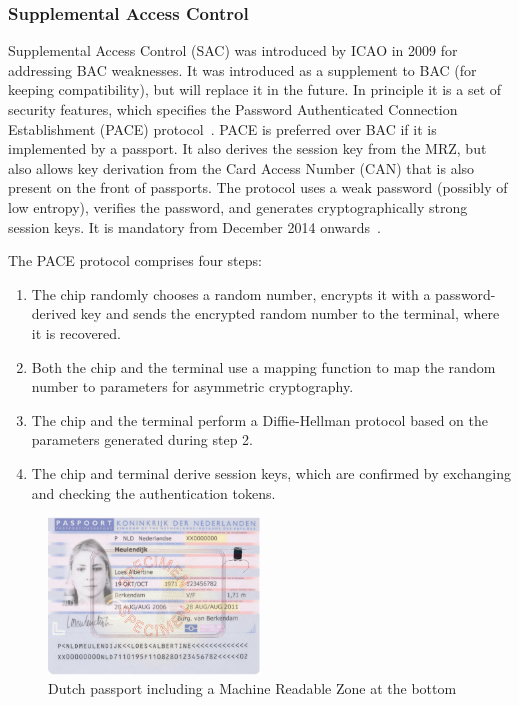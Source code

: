 \subsubsection{Supplemental Access Control}
Supplemental Access Control (SAC) was introduced by ICAO in 2009 for addressing BAC weaknesses. It was introduced as a supplement to BAC (for keeping compatibility), but will replace it in the future. In principle it is a set of security features, which specifies the Password Authenticated Connection Establishment (PACE) protocol~\cite{icao}. PACE is preferred over BAC if it is implemented by a passport. It also derives the session key from the MRZ, but also allows key derivation from the Card Access Number (CAN) that is also present on the front of passports. The protocol uses a weak password (possibly of low entropy), verifies the password, and generates cryptographically strong session keys. It is mandatory from December 2014 onwards~\cite{gemalto}.

The PACE protocol comprises four steps:
\begin{enumerate}
	\item The chip randomly chooses a random number, encrypts it with a password-derived key and sends the encrypted random number to the terminal, where it is recovered.
  \item Both the chip and the terminal use a mapping function to map the random number to parameters for asymmetric cryptography. 
  \item The chip and the terminal perform a Diffie-Hellman protocol based on the parameters generated during step 2. 
  \item The chip and terminal derive session keys, which are confirmed by exchanging and checking the authentication tokens.
\end{enumerate}

\begin{figure}[htb]
	\centering
		\includegraphics[width=0.50\textwidth]{images/dutchpassport.png}
	\caption{Dutch passport including a Machine Readable Zone at the bottom}
	\label{fig:dutchpassport}
\end{figure}

